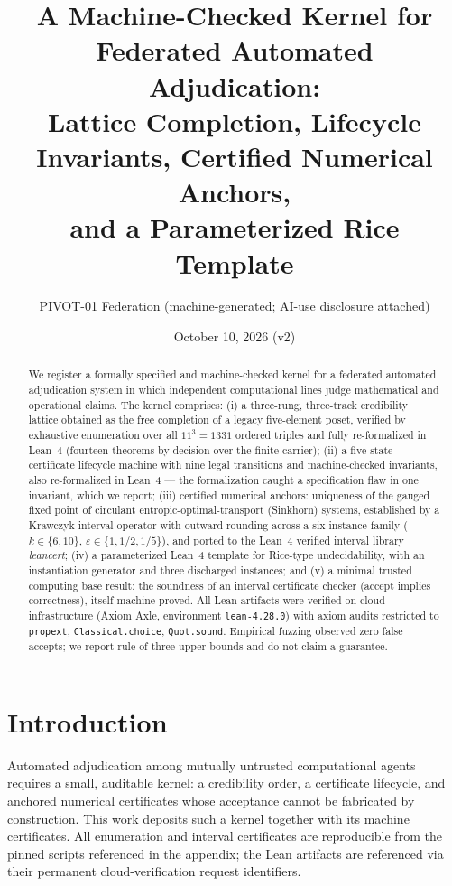 \documentclass[11pt]{article}
\title{A Machine-Checked Kernel for Federated Automated Adjudication:\\
Lattice Completion, Lifecycle Invariants, Certified Numerical Anchors,\\
and a Parameterized Rice Template}
\author{PIVOT-01 Federation (machine-generated; AI-use disclosure attached)}
\date{October 10, 2026 (v2)}
\begin{document}
\maketitle

\begin{abstract}
We register a formally specified and machine-checked kernel for a federated
automated adjudication system in which independent computational lines judge
mathematical and operational claims. The kernel comprises: (i) a three-rung,
three-track credibility lattice obtained as the free completion of a legacy
five-element poset, verified by exhaustive enumeration over all $11^3=1331$
ordered triples and fully re-formalized in Lean~4 (fourteen theorems by
decision over the finite carrier); (ii) a five-state certificate lifecycle
machine with nine legal transitions and machine-checked invariants, also
re-formalized in Lean~4 --- the formalization caught a specification flaw in
one invariant, which we report; (iii) certified numerical anchors: uniqueness
of the gauged fixed point of circulant entropic-optimal-transport (Sinkhorn)
systems, established by a Krawczyk interval operator with outward rounding
across a six-instance family ($k\in\{6,10\}$, $\varepsilon\in\{1,1/2,1/5\}$),
and ported to the Lean~4 verified interval library \emph{leancert}; (iv) a
parameterized Lean~4 template for Rice-type undecidability, with an
instantiation generator and three discharged instances; and (v) a minimal
trusted computing base result: the soundness of an interval certificate
checker (accept implies correctness), itself machine-proved. All Lean
artifacts were verified on cloud infrastructure (Axiom Axle, environment
\texttt{lean-4.28.0}) with axiom audits restricted to
\texttt{propext}, \texttt{Classical.choice}, \texttt{Quot.sound}.
Empirical fuzzing observed zero false accepts; we report rule-of-three upper
bounds and do not claim a guarantee.
\end{abstract}

\section{Introduction}
Automated adjudication among mutually untrusted computational agents requires
a small, auditable kernel: a credibility order, a certificate lifecycle, and
anchored numerical certificates whose acceptance cannot be fabricated by
construction. This work deposits such a kernel together with its machine
certificates. All enumeration and interval certificates are reproducible from
the pinned scripts referenced in the appendix; the Lean artifacts are
referenced via their permanent cloud-verification request identifiers.
\end{document}
